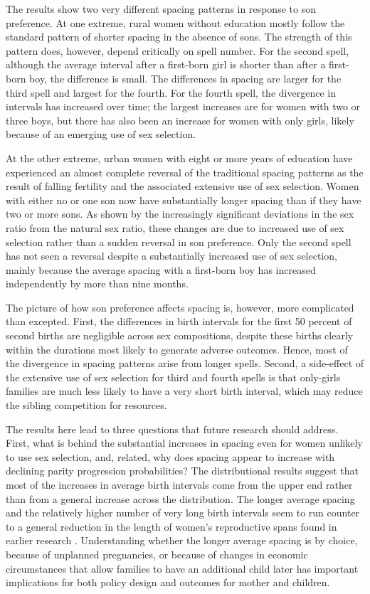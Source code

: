 \documentclass[12pt,letterpaper]{article}
\begin{document}
The results show two very different spacing patterns in response to son preference.
At one extreme, rural women without education mostly follow the standard pattern of 
shorter spacing in the absence of sons.
The strength of this pattern does, however, depend critically on spell number.
For the second spell, although the average interval after a first-born girl is shorter
than after a first-born boy, the difference is small.
The differences in spacing are larger for the third spell and largest for the fourth.
For the fourth spell, the divergence in intervals has increased over time; the largest 
increases are for women with two or three boys, but there has also been an increase for 
women with only girls, likely because of an emerging use of sex selection.

At the other extreme, urban women with eight or more years of education have experienced 
an almost complete reversal of the traditional spacing patterns as the result of falling
fertility and the associated extensive use of sex selection.
Women with either no or one son now have substantially longer spacing than if they have 
two or more sons.
As shown by the increasingly significant deviations in the sex ratio from the natural sex 
ratio, these changes are due to increased use of sex selection rather than a sudden
reversal in son preference.
Only the second spell has not seen a reversal despite a substantially increased use of
sex selection, mainly because the average spacing with a first-born boy has increased 
independently by more than nine months.

The picture of how son preference affects spacing is, however, more complicated than 
excepted.
First, the differences in birth intervals for the first 50 percent of second births are 
negligible across sex compositions, despite these births clearly within the 
durations most likely to generate adverse outcomes.
Hence, most of the divergence in spacing patterns arise from longer spells.
Second, a side-effect of the extensive use of sex selection for third and fourth 
spells is that only-girls families are much less likely to have a very short birth 
interval, which may reduce the sibling competition for resources.


The results here lead to three questions that future research should address.
First, what is behind the substantial increases in spacing even for women unlikely to use 
sex selection, and, related, why does spacing appear to increase with declining 
parity progression probabilities?
The distributional results suggest that most of the increases in average birth intervals 
come from the upper end rather than from a general increase across the distribution.
The longer average spacing and the relatively higher number of very long birth intervals 
seem to run counter to a general reduction in the length of women's reproductive spans 
found in earlier research \citep{Padmadas2004}.
Understanding whether the longer average spacing is by choice, because of unplanned 
pregnancies, or because of changes in economic circumstances that allow families to have 
an additional child later has important implications for both policy design and outcomes 
for mother and children.
\end{document}
